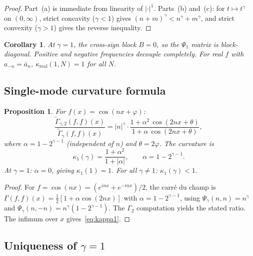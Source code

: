 \documentclass[11pt,a4paper]{article}
\theoremstyle{plain}
\newtheorem{proposition}[theorem]{Proposition}
\newtheorem{corollary}[theorem]{Corollary}
\theoremstyle{definition}
\theoremstyle{remark}
\begin{document}
\begin{proof}
Part~(a) is immediate from linearity of $|\cdot|^1$.
Parts~(b) and~(c): for $t \mapsto t^\gamma$ on $(0,\infty)$,
strict concavity ($\gamma < 1$) gives
$(n+m)^\gamma < n^\gamma + m^\gamma$, and strict convexity
($\gamma > 1$) gives the reverse inequality.
\end{proof}

\begin{corollary}\label{cor:block-diag}
At $\gamma = 1$, the cross-sign block $B = 0$, so the $\Psi_1$
matrix is block-diagonal. Positive and negative frequencies
decouple completely. For real $f$ with $a_{-n} = \bar{a}_n$,
$\kappa_{\mathrm{real}}(1,N) = 1$ for all $N$.
\end{corollary}


\subsection{Single-mode curvature formula}

\begin{proposition}\label{prop:single-mode}
For $f(x) = \cos(nx + \varphi)$:
\begin{equation}\label{eq:single-mode}
  \frac{\widetilde{\Gamma}_{\gamma,2}(f,f)(x)}
       {\widetilde{\Gamma}_\gamma(f,f)(x)}
  = |n|^\gamma \cdot
  \frac{1 + \alpha^2\,\cos(2nx+\theta)}
       {1 + \alpha\,\cos(2nx+\theta)},
\end{equation}
where $\alpha = 1 - 2^{\gamma-1}$ (independent of $n$)
and $\theta = 2\varphi$. The curvature is
\begin{equation}\label{eq:kappa1}
  \kappa_1(\gamma) = \frac{1 + \alpha^2}{1 + |\alpha|},
  \qquad \alpha = 1 - 2^{\gamma-1}.
\end{equation}
At $\gamma = 1$: $\alpha = 0$, giving $\kappa_1(1) = 1$.
For all $\gamma \neq 1$: $\kappa_1(\gamma) < 1$.
\end{proposition}

\begin{proof}
For $f = \cos(nx) = (e^{inx} + e^{-inx})/2$, the carr\'e du champ is
$\Gamma(f,f)(x) = \tfrac{1}{2}[1 + \alpha\cos(2nx)]$
with $\alpha = 1 - 2^{\gamma-1}$,
using $\Psi_\gamma(n,n) = n^\gamma$ and
$\Psi_\gamma(n,-n) = n^\gamma(1 - 2^{\gamma-1})$.
The $\Gamma_2$ computation yields the stated ratio.
The infimum over $x$ gives~\eqref{eq:kappa1}.
\end{proof}


\subsection{Uniqueness of $\gamma = 1$}
\end{document}

